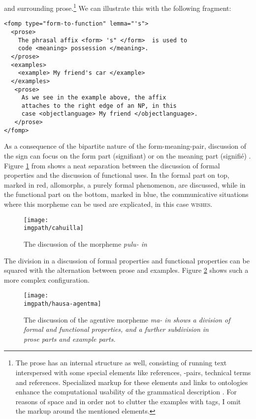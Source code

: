 and surrounding prose.\footnote{The
 prose has an internal structure as well, consisting of running text interspersed with some special elements like references, -pairs, technical terms and references. Specialized markup for these elements and links to ontologies enhance the computational usability of the grammatical description \citep{FarrarEtAl2003,Good2004}. For reasons of space and in order not to clutter the examples with tags, I omit the markup around the mentioned elements.
} 
We can illustrate this with the following fragment:

\ea
\label{xml:fofomp:intro}
\begin{verbatim}
<fomp type="form-to-function" lemma="'s">
  <prose>
    The phrasal affix <form> 's" </form>  is used to
    code <meaning> possession </meaning>.
  </prose>
  <examples>
    <example> My friend's car </example>
  </examples>
   <prose>
     As we see in the example above, the affix
     attaches to the right edge of an NP, in this
     case <objectlanguage> My friend </objectlanguage>.
   </prose>
</fomp>
\end{verbatim}
\z
 

As a consequence of the bipartite nature of the form-meaning-pair, discussion of the sign can focus on the form part (signifiant) or on the meaning part (signifié) \citep{Lehmann2004funkt}. Figure \ref{fig:cahuilla} from \citet{Seiler1985} shows a neat separation between the discussion of formal properties and the discussion of functional uses. In the formal part on top, marked in red, allomorphs, a purely formal phenomenon, are discussed, while in the functional part on the bottom, marked in blue, the communicative situations where this morpheme can be used are explicated, in this case \textsc{wishes}.

\begin{figure}
\texttt{[image: \\imgpath/cahuilla]} 
\caption{The discussion of the morpheme \em pulu- \em in \citet{Seiler1985}}
\label{fig:cahuilla}
\end{figure}


The division in a discussion of formal properties and functional properties can be squared with the alternation between prose and examples. Figure \ref{fig:hausa:ma} shows such a more complex configuration.

\begin{figure}
\texttt{[image: \\imgpath/hausa-agentma]}
\caption{The discussion of the agentive morpheme \em ma- \em in \citet{Newman2000} shows a division of formal and functional properties, and a further subdivision in
\\
 prose parts and example parts.}
\label{fig:hausa:ma}
\end{figure}

